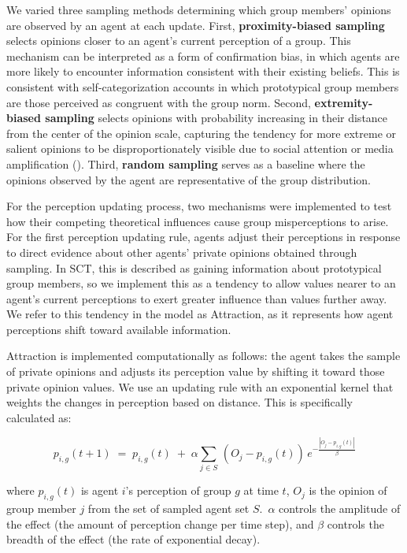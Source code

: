 We varied three sampling methods determining which group members' opinions are observed by an agent at each update. First, \textbf{proximity-biased sampling} selects opinions closer to an agent's current perception of a group. This mechanism can be interpreted as a form of confirmation bias, in which agents are more likely to encounter information consistent with their existing beliefs. 
This is consistent with self-categorization accounts in which prototypical group members are those perceived as congruent with the group norm. Second, \textbf{extremity-biased sampling} selects opinions with probability increasing in their distance from the center of the opinion scale, capturing the tendency for more extreme or salient opinions to be disproportionately visible due to social attention or media amplification (\cite{robertson_inside_2024}). 
Third, \textbf{random sampling} serves as a baseline where the opinions observed by the agent are representative of the group distribution. 

For the perception updating process, two mechanisms were implemented to test how their competing theoretical influences cause group misperceptions to arise. For the first perception updating rule, agents adjust their perceptions in response to direct evidence about other agents' private opinions obtained through sampling. In SCT, this is described as gaining information about prototypical group members, so we implement this as a tendency to allow values nearer to an agent's current perceptions to exert greater influence than values further away. 
We refer to this tendency in the model as Attraction, as it represents how agent perceptions shift toward available information.

Attraction is implemented computationally as follows: the agent takes the sample of private opinions and adjusts its perception value by shifting it toward those private opinion values. We use an updating rule with an exponential kernel that weights the changes in perception based on distance. This is specifically calculated as:

\[
p_{i,g}(t+1) \;=\; p_{i,g}(t) \;+\; \alpha \sum_{j \in S} \, (O_j - p_{i,g}(t)) \, e^{-\tfrac{|O_j - p_{i,g}(t)|}{\beta}}
\]

where \( p_{i,g}(t) \) is agent $i$'s perception of group $g$ at time $t$, $O_j$ is the opinion of group member $j$ from the set of sampled agent set $S$.~\( \alpha \) controls the amplitude of the effect (the amount of perception change per time step), and \( \beta \) controls the breadth of the effect (the rate of exponential decay). 

